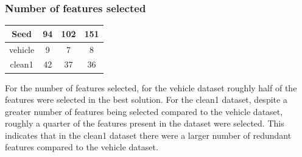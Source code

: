 \documentclass{article}
\begin{document}
\subsubsection*{Number of features selected}
\begin{center}
\begin{tabular}{|c|c|c|c|}
\hline
Seed & 94 & 102 & 151 \\
\hline
vehicle & 9 & 7 & 8 \\
\hline
clean1 & 42 & 37 & 36 \\
\hline
\end{tabular}
\end{center}
For the number of features selected, for the vehicle dataset roughly half of the features were selected in the best solution. For the clean1 dataset, despite a greater number of features being selected compared to the vehicle dataset, roughly a quarter of the features present in the dataset were selected. This indicates that in the clean1 dataset there were a larger number of redundant features compared to the vehicle dataset. 
\end{document}
